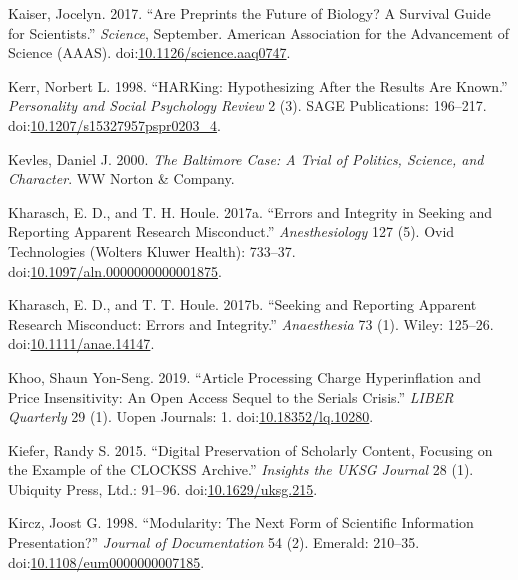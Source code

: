 \documentclass[a5paper]{book}
\begin{document}
\hypertarget{ref-doi:10.1126ux2fscience.aaq0747}{}
Kaiser, Jocelyn. 2017. ``Are Preprints the Future of Biology? A Survival
Guide for Scientists.'' \emph{Science}, September. American Association
for the Advancement of Science (AAAS).
doi:\href{https://doi.org/10.1126/science.aaq0747}{10.1126/science.aaq0747}.

\hypertarget{ref-doi:10.1207ux2fs15327957pspr0203_4}{}
Kerr, Norbert L. 1998. ``HARKing: Hypothesizing After the Results Are
Known.'' \emph{Personality and Social Psychology Review} 2 (3). SAGE
Publications: 196--217.
doi:\href{https://doi.org/10.1207/s15327957pspr0203_4}{10.1207/s15327957pspr0203\_4}.

\hypertarget{ref-isbn:9780393319705}{}
Kevles, Daniel J. 2000. \emph{The Baltimore Case: A Trial of Politics,
Science, and Character}. WW Norton \& Company.

\hypertarget{ref-doi:10.1097ux2faln.0000000000001875}{}
Kharasch, E. D., and T. H. Houle. 2017a. ``Errors and Integrity in
Seeking and Reporting Apparent Research Misconduct.''
\emph{Anesthesiology} 127 (5). Ovid Technologies (Wolters Kluwer
Health): 733--37.
doi:\href{https://doi.org/10.1097/aln.0000000000001875}{10.1097/aln.0000000000001875}.

\hypertarget{ref-doi:10.1111ux2fanae.14147}{}
Kharasch, E. D., and T. T. Houle. 2017b. ``Seeking and Reporting
Apparent Research Misconduct: Errors and Integrity.'' \emph{Anaesthesia}
73 (1). Wiley: 125--26.
doi:\href{https://doi.org/10.1111/anae.14147}{10.1111/anae.14147}.

\hypertarget{ref-doi:10.18352ux2flq.10280}{}
Khoo, Shaun Yon-Seng. 2019. ``Article Processing Charge Hyperinflation
and Price Insensitivity: An Open Access Sequel to the Serials Crisis.''
\emph{LIBER Quarterly} 29 (1). Uopen Journals: 1.
doi:\href{https://doi.org/10.18352/lq.10280}{10.18352/lq.10280}.

\hypertarget{ref-doi:10.1629ux2fuksg.215}{}
Kiefer, Randy S. 2015. ``Digital Preservation of Scholarly Content,
Focusing on the Example of the CLOCKSS Archive.'' \emph{Insights the
UKSG Journal} 28 (1). Ubiquity Press, Ltd.: 91--96.
doi:\href{https://doi.org/10.1629/uksg.215}{10.1629/uksg.215}.

\hypertarget{ref-doi:10.1108ux2feum0000000007185}{}
Kircz, Joost G. 1998. ``Modularity: The Next Form of Scientific
Information Presentation?'' \emph{Journal of Documentation} 54 (2).
Emerald: 210--35.
doi:\href{https://doi.org/10.1108/eum0000000007185}{10.1108/eum0000000007185}.
\end{document}
